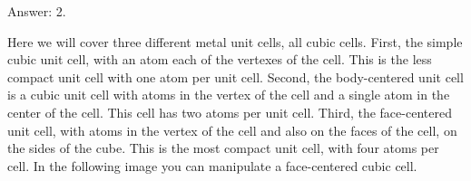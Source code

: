 \documentclass[main.tex]{subfiles}
\begin{document}
\begin{description}
\begin{example}
\begin{center}
\end{center}
\begin{flushright} Answer: 2.\end{flushright}
\end{example}%



\item[\docfilehook{Metal unit cells}{}] Here we will cover three different metal unit cells, all cubic cells. First, the simple cubic unit cell, with an atom each of the vertexes of the cell. This is the less compact unit cell with one atom per unit cell. Second, the body-centered unit cell is a cubic unit cell with atoms in the vertex of the cell and a single atom in the center of the cell. This cell has two atoms per unit cell. Third, the face-centered unit cell, with atoms in the vertex of the cell and also on the faces of the cell, on the sides of the cube. This is the most compact unit cell, with four atoms per cell. In the following image you can manipulate a face-centered cubic cell.


\end{description}
\end{document}

